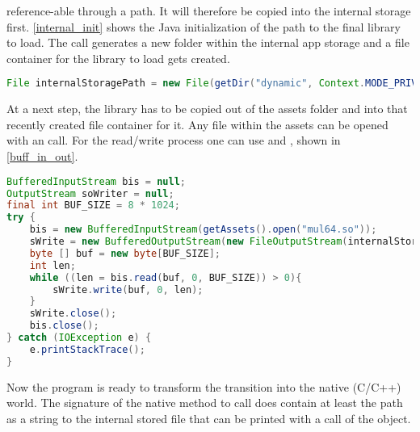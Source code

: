 reference-able through a path. It will therefore be copied into the internal storage first. \autoref{internal_init} shows the Java initialization of the path to the final library to load. The  call generates a new folder within the internal app storage and a file container for the library to load gets created. 
\begin{lstlisting}[language=Java, caption=Internal Storage Initialization, label=internal_init]
File internalStoragePath = new File(getDir("dynamic", Context.MODE_PRIVATE), "mul.so");
\end{lstlisting}
At a next step, the library has to be copied out of the assets folder and into that 
recently created file container for it. Any file within the assets can be opened with an
 call. For the read/write process one can use
 and , shown in 
\autoref{buff_in_out}.
\begin{lstlisting}[language=Java, caption=Buffered Input/Output, label=buff_in_out]
BufferedInputStream bis = null;
OutputStream soWriter = null;
final int BUF_SIZE = 8 * 1024;
try {
    bis = new BufferedInputStream(getAssets().open("mul64.so"));
    sWrite = new BufferedOutputStream(new FileOutputStream(internalStoragePath));
    byte [] buf = new byte[BUF_SIZE];
    int len;
    while ((len = bis.read(buf, 0, BUF_SIZE)) > 0){
        sWrite.write(buf, 0, len);
    }
    sWrite.close();
    bis.close();
} catch (IOException e) {
    e.printStackTrace();
}
\end{lstlisting}
Now the program is ready to transform the transition into the native (C/C++) world.
The signature of the native method to call does contain at least the path as a string to
the internal stored file that can be printed with a  call of the
 object.  
